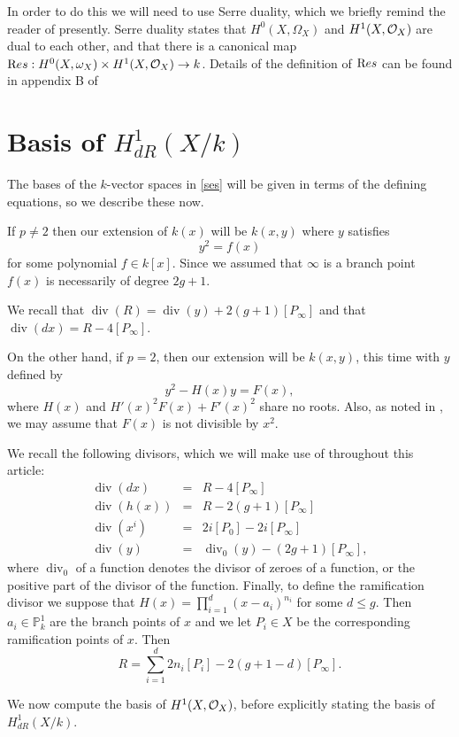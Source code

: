 \documentclass[draft, 11pt]{article} %
\theoremstyle{plain}
\theoremstyle{remark}
\newcommand{\cO}{{\cal O}}
\DeclareMathOperator{\di}{div}
\begin{document}
{In order to do this we will need to use Serre duality, which we briefly remind the reader of presently.
Serre duality states that $H^0(X,\Omega_X)$ and $H^1(X,\cO_X)$ are dual to each other, and that there is a canonical map ${\text Res}:H^0(X,\omega_X) \times H^1(X,\cO_X) \rightarrow k$.
Details of the definition of ${\text Res}$ can be found in appendix B of 

\section{Basis of $H^1_{dR}(X/k)$}

The bases of the $k$-vector spaces in \ref{ses} will be given in terms of the defining equations, so we describe these now.

If $p \neq 2$ then our extension of $k(x)$ will be $k(x,y)$ where $y$ satisfies
\[
y^2 = f(x)
\]
for some polynomial $f \in k[x]$.
Since we assumed that $\infty$ is a branch point $f(x)$ is necessarily of degree $2g+1$.

We recall that $\di (R) = \di(y) + 2(g+1)[P_\infty]$ and that $\di( dx) = R - 4[P_\infty]$.

On the other hand, if $p=2$, then our extension will be $k(x,y)$, this time with $y$ defined by
\[
y^2 - H(x)y = F(x),
\]
where $H(x)$ and $H'(x)^2F(x) + F'(x)^2$ share no roots.
Also, as noted in \cite[\S 6]{faithfulaction}, we may assume that $F(x)$ is not divisible by $x^2$.

We recall the following divisors, which we will make use of throughout this article:
\begin{eqnarray*}
\di (dx) & = & R - 4[P_\infty] \\
\di (h(x)) & = & R - 2(g+1)[P_\infty] \\
\di (x^i) & = & 2i[P_0] - 2i[P_\infty]\\
\di (y) & = & \di_0(y) - (2g+1)[P_\infty],
\end{eqnarray*}
where $\di_0$ of a function denotes the divisor of zeroes of a function, or the positive part of the divisor of the function.
Finally, to define the ramification divisor we suppose that $H(x) = \prod_{i=1}^d (x-a_i)^{n_i}$ for some $d \leq g$.
Then $a_i \in \mathbb P_k^1$ are the branch points of $x$ and we let $P_i \in X$ be the corresponding ramification points of $x$.
Then
\[
R = \sum_{i=1}^d 2n_i[P_i] - 2(g+1-d)[P_\infty].
\]

We now compute the basis of $H^1(X,\cO_X)$, before explicitly stating the basis of $H^1_{dR}(X/k)$.\\

}
\end{document}
